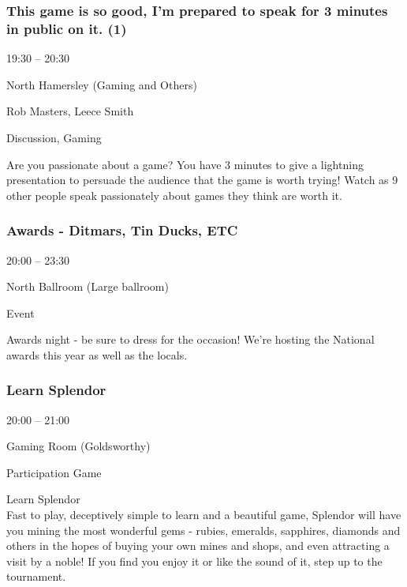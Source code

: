 \documentclass{scrreprt}
\begin{document}
\begin{multicols}{2}
\subsubsection*{This game is so good, I'm prepared to speak for 3 minutes in public on it. (1)}\begin{description}
\setlength{\itemsep}{0pt}
\setlength{\parsep}{0pt}
\setlength{\parskip}{0pt}
\item[Time:]{19:30 -- 20:30}
\item[Venue:]{North Hamersley (Gaming and Others)}
\item[People:]{Rob Masters, Leece Smith}
\item[Tags:]{Discussion, Gaming}\end{description}
Are you passionate about a game? You have 3 minutes to give a lightning presentation to persuade the audience that the game is worth trying! Watch as 9 other people speak passionately about games they think are worth it.
\subsubsection*{Awards - Ditmars, Tin Ducks, ETC}\begin{description}
\setlength{\itemsep}{0pt}
\setlength{\parsep}{0pt}
\setlength{\parskip}{0pt}
\item[Time:]{20:00 -- 23:30}
\item[Venue:]{North Ballroom (Large ballroom)}
\item[Tags:]{Event}\end{description}
Awards night - be sure to dress for the occasion! We're hosting the National awards this year as well as the locals.
\subsubsection*{Learn Splendor}\begin{description}
\setlength{\itemsep}{0pt}
\setlength{\parsep}{0pt}
\setlength{\parskip}{0pt}
\item[Time:]{20:00 -- 21:00}
\item[Venue:]{Gaming Room (Goldsworthy)}
\item[Tags:]{Participation Game}\end{description}
Learn Splendor\\Fast to play, deceptively simple to learn and a beautiful game, Splendor will have you mining the most wonderful gems - rubies, emeralds, sapphires, diamonds and others in the hopes of buying your own mines and shops, and even attracting a visit by a noble! If you find you enjoy it or like the sound of it, step up to the tournament.

\end{multicols}
\end{document}
